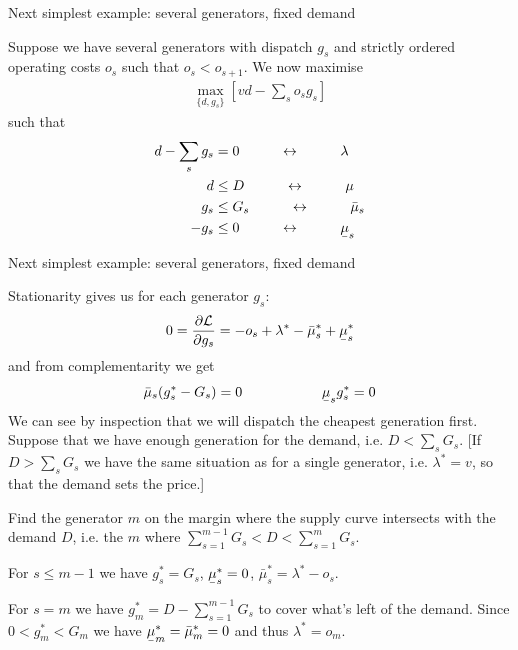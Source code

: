 \documentclass[10pt,aspectratio=169,dvipsnames]{beamer}
\def\l{\lambda}
\def\m{\mu}
\def\d{\partial}
\def\cL{\mathcal{L}}
\newcommand{\ubar}[1]{\text{\b{$#1$}}}
\begin{document}
\begin{frame}{Next simplest example: several generators, fixed demand}

  Suppose we have several generators with dispatch $g_s$ and strictly ordered
  operating costs $o_s$ such that $o_s < o_{s+1}$. We now maximise
  \begin{align*}
    \max_{\{d, g_s\}}  \left[ vd  -  \sum_s o_s g_s \right]
  \end{align*}
  such that
  \begin{align*}
    d -  \sum_s g_s  & = 0 \hspace{1cm} \leftrightarrow \hspace{1cm} \l \\
    d & \leq D  \hspace{1cm} \leftrightarrow \hspace{1cm} \m \\
        g_s  & \leq  G_s  \hspace{1cm}\leftrightarrow\hspace{1cm} \bar{\m}_s \\
    - g_s  & \leq  0  \hspace{1cm}\leftrightarrow\hspace{1cm} \ubar{\m}_s
  \end{align*}


\end{frame}

\begin{frame}{Next simplest example: several generators, fixed demand}

  Stationarity gives us for each generator $g_s$:
  \begin{align*}
    0  = \frac{\d \cL}{\d g_s} = -o_s + \l^* - \bar{\m}^*_s + \ubar{\m}^*_s
  \end{align*}
  and from complementarity we get
  \begin{align*}
    \bar{\m}_s(g_s^* - G_s)  = 0 \hspace{2cm}    \ubar{\m}_sg_s^*  = 0
  \end{align*}
  We can see by inspection that we will dispatch the cheapest
  generation first. Suppose that we have enough generation for the
  demand, i.e. $D < \sum_s G_s$. [If $D > \sum_s G_s$ we have the same
    situation as for a single generator, i.e. $\l^* = v$, so that the demand sets the price.]

  Find the generator $m$ on the margin where the supply curve
  intersects with the demand $D$, i.e. the $m$ where $\sum_{s=1}^{m-1}
  G_s < D < \sum_{s=1}^{m} G_s$.

  For $s \leq m-1$ we have $g_s^* = G_s$, $\ubar{\m}^*_s = 0$,
  $\bar{\m}^*_s =  \l^* - o_s$.

  For $s = m$ we have $g_m^* = D - \sum_{s=1}^{m-1} G_s$ to cover
  what's left of the demand. Since $0 < g_m^* < G_m$ we have
  $\ubar{\m}^*_m = \bar{\m}^*_m = 0$ and thus $\l^* = o_m$.


\end{frame}
\end{document}

